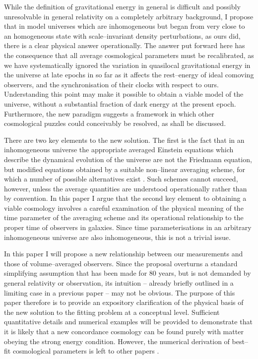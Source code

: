 \documentclass[12pt]{iopart}
\begin{document}
While the definition of gravitational energy in general is difficult and
possibly unresolvable in general relativity on a completely arbitrary
background, I propose that
in model universes which are inhomogeneous but began from very close to an
homogeneous state with scale--invariant density perturbations, as ours did,
there is a clear physical answer operationally. The answer put forward here
has the consequence that all average cosmological parameters must be
recalibrated, as we have systematically ignored the variation in quasilocal
gravitational energy in the universe at late epochs in so far as it
affects the rest--energy of ideal comoving observers, and the synchronisation
of their clocks with respect to ours. Understanding this point may make it
possible to obtain a viable model of the universe, without a substantial
fraction of dark energy at the present epoch. Furthermore, the new
paradigm suggests a framework in which other cosmological puzzles could
conceivably be resolved, as shall be discussed.

There are two key elements to the new solution. The first is the fact that
in an inhomogeneous universe the appropriate averaged Einstein equations
which describe the dynamical evolution of the universe are not the Friedmann
equation, but modified equations obtained by a suitable non--linear averaging
scheme, for which a number of possible alternatives exist \cite{buch1,Zal1}.
Such schemes cannot succeed, however, unless the average quantities
are understood operationally rather than by convention. In this paper
I argue that the second key element to obtaining a viable cosmology
involves a careful examination of the physical meaning of the time
parameter of the averaging scheme and its operational relationship to the
proper time of observers in galaxies. Since time parameterisations in an
arbitrary inhomogeneous universe are also inhomogeneous, this is not a
trivial issue.

In this paper I will propose a new relationship between
our measurements and those of volume--averaged observers.
Since the proposal overturns a standard simplifying assumption that
has been made for 80 years, but is not demanded by general relativity or
observation, its intuition -- already briefly outlined in a limiting case
in a previous paper \cite{paper0} -- may not be obvious. The purpose of
this paper therefore is to provide an expository clarification of the
physical basis of the new solution to the fitting problem
at a conceptual level. Sufficient quantitative details and numerical
examples will be
provided to demonstrate that it is likely that a new concordance
cosmology can be found purely with matter obeying the strong energy
condition. However, the numerical derivation of best--fit
cosmological parameters is left to other papers \cite{paper1,paper2}.
\end{document}
